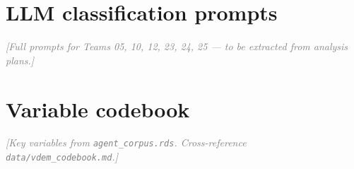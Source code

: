 \documentclass[12pt,a4paper]{article}
\newcommand{\placeholder}[1]{\textcolor{gray}{\textit{[#1]}}}
\begin{document}
\section{LLM classification prompts}
\label{app:prompts}

\placeholder{Full prompts for Teams 05, 10, 12, 23, 24, 25 --- to be
extracted from analysis plans.}

\section{Variable codebook}
\label{app:codebook}

\placeholder{Key variables from \texttt{agent\_corpus.rds}. Cross-reference
\texttt{data/vdem\_codebook.md}.}
\end{document}
